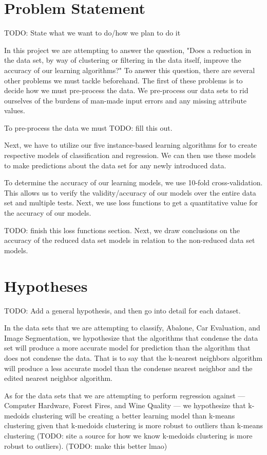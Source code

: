 \documentclass[twoside,11pt]{article}
\begin{document}
\section{Problem Statement}
TODO: State what we want to do/how we plan to do it

In this project we are attempting to answer the question, "Does a reduction in the data set, by way of clustering or filtering in the data itself, improve the accuracy of our learning algorithms?" To answer this question, there are several other problems we must tackle beforehand. The first of these problems is to decide how we must pre-process the data. We pre-process our data sets to rid ourselves of the burdens of man-made input errors and any missing attribute values.

To pre-process the data we must TODO: fill this out.

Next, we have to utilize our five instance-based learning algorithms for to create respective models of classification and regression. We can then use these models to make predictions about the data set for any newly introduced data.

To determine the accuracy of our learning models, we use 10-fold cross-validation. This allows us to verify the validity/accuracy of our models over the entire data set and multiple tests. Next, we use loss functions to get a quantitative value for the accuracy of our models.

TODO: finish this loss functions section. Next, we draw conclusions on the accuracy of the reduced data set models in relation to the non-reduced data set models.

\section{Hypotheses}

TODO: Add a general hypothesis, and then go into detail for each dataset.

In the data sets that we are attempting to classify, Abalone, Car Evaluation, and Image Segmentation, we hypothesize that the algorithms that condense the data set will produce a more accurate model for prediction than the algorithm that does not condense the data. That is to say that the k-nearest neighbors algorithm will produce a less accurate model than the condense nearest neighbor and the edited nearest neighbor algorithm.

As for the data sets that we are attempting to perform regression against --- Computer Hardware, Forest Fires, and Wine Quality --- we hypothesize that k-medoids clustering will be creating a better learning model than k-means clustering given that k-medoids clustering is more robust to outliers than k-means clustering (TODO: site a source for how we know k-medoids clustering is more robust to outliers). (TODO: make this better lmao)
\end{document}
